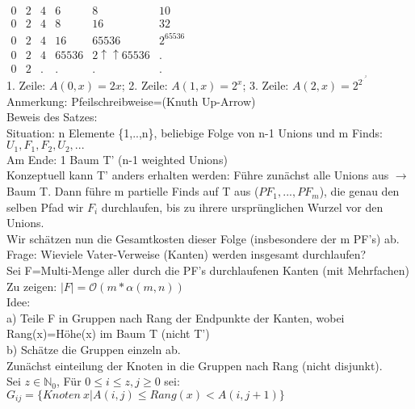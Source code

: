 \documentclass[a4paper]{article}
\newcommand{\oh}[1]{$\mathcal{O}(#1)$}
\begin{document}
$\begin{matrix}
0&2&4&6&8&10\\
0&2&4&8&16&32\\
0&2&4&16&65536&2^{65536}&\\
0&2&4&65536&2\uparrow\uparrow65536&.\\
0&2&.&.&.&.
\end{matrix}
$\\
1. Zeile: $A(0,x)=2x$; 2. Zeile: $A(1,x)=2^x$; 3. Zeile: $A(2,x)=2^{2^{.^{.^2}}}$\\
Anmerkung: Pfeilschreibweise=(Knuth Up-Arrow)\\
Beweis des Satzes:\\
Situation: n Elemente \{1,..,n\}, beliebige Folge von n-1 Unions und m Finds: $U_1,F_1,F_2,U_2,...$\\
Am Ende: 1 Baum T' (n-1 weighted Unions)\\
Konzeptuell kann T' anders erhalten werden: Führe zunächst alle Unions aus $\rightarrow$ Baum T. Dann führe m partielle Finds auf T aus ($PF_1,...,PF_m$), die genau den selben Pfad wir $F_i$ durchlaufen, bis zu ihrere ursprünglichen Wurzel vor den Unions.\\
Wir schätzen nun die Gesamtkosten dieser Folge (insbesondere der m PF's) ab.\\
Frage: Wieviele Vater-Verweise (Kanten) werden insgesamt durchlaufen?\\
Sei F=Multi-Menge aller durch die PF's durchlaufenen Kanten (mit Mehrfachen)\\
Zu zeigen: $|F| = $\oh{m*\alpha(m,n)}\\
Idee:\\
a) Teile F in Gruppen nach Rang der Endpunkte der Kanten, wobei Rang(x)=Höhe(x) im Baum T (nicht T')\\
b) Schätze die Gruppen einzeln ab.\\
Zunächst einteilung der Knoten in die Gruppen nach Rang (nicht disjunkt).\\
Sei $z\in\mathbb{N}_0$, Für $0\leq i \leq z, j\geq 0$ sei:\\
$G_{ij}=\lbrace Knoten\ x|A(i,j)\leq Rang(x)<A(i,j+1)\rbrace$\\
\end{document}
